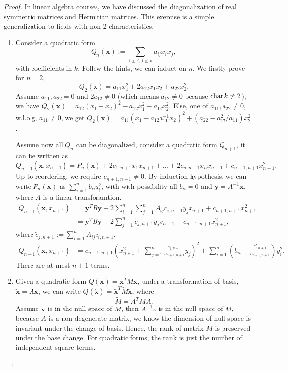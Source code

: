 \documentclass[11pt,fleqn]{book} %
\begin{document}
\begin{proof}
In linear algebra courses, we have discussed the diagonalization of real symmetric matrices and Hermitian matrices. This exercise is a simple generalization to fields with non-2 characteristics.
\begin{enumerate}[label=(\alph*)]
\item Consider a quadratic form 
$$
Q_{n}(\mathbf{x}):=\sum_{1\leq i,j\leq n}a_{ij}x_ix_j,
$$
with coefficients in $k$.
Follow the hints, we can induct on $n$. We firstly prove for $n=2$,
$$
Q_2(\mathbf{x})=a_{11}x_1^2+2a_{12}x_1x_2+a_{22}x_2^2.
$$
Assume $a_{11},a_{22}=0$ and $2a_{12}\neq 0$ (which means $a_{12}\neq 0$ because $\text{char\,} k\neq 2$), we have $Q_{2}(\mathbf{x})=a_{12}(x_1+x_2)^2-a_{12}x_1^2-a_{12}x_2^2$. Else, one of $a_{11},a_{22}\neq 0$, w.l.o.g, $a_{11}\neq 0$, we get $Q_2(\mathbf{x})=a_{11}(x_1-a_{12}a_{11}^{-1}x_2)^2+(a_{22}-a_{12}^2/a_{11})x_2^2$.

Assume now all $Q_n$ can be diagonalized, consider a quadratic form $Q_{n+1}$, it can be written as 
$$
Q_{n+1}(\mathbf{x},x_{n+1})=P_{n}(\mathbf{x})+2c_{1,n+1}x_1x_{n+1}+...+2c_{n,n+1}x_nx_{n+1}+c_{n+1,n+1}x_{n+1}^2.
$$
Up to reordering, we require $c_{n+1,n+1}\neq 0$.
By induction hypothesis, we can write $P_n(\mathbf{x})$ as $\sum_{i=1}^n b_{ii}y_i^2$, with with possibility all $b_{ii}=0$ and $\mathbf{y}=A^{-1}\mathbf{x}$, where $A$ is a linear transforamtion.
$$
\begin{aligned}
Q_{n+1}(\mathbf{x},x_{n+1})&=\mathbf{y}^{T}B\mathbf{y}+2\sum_{i=1}^n\sum_{j=1}^n A_{ij}c_{i,n+1}y_jx_{n+1}+c_{n+1,n+1}x_{n+1}^2\\
&=\mathbf{y}^{T}B\mathbf{y}+2\sum_{j=1}^n \tilde{c}_{j,n+1}y_jx_{n+1}+c_{n+1,n+1}x_{n+1}^2,
\end{aligned}
$$ 
where $\tilde{c}_{j,n+1}:=\sum_{i=1}^nA_{ij} c_{i,n+1}$.
$$
\begin{aligned}
Q_{n+1}(\mathbf{x},x_{n+1})
&=c_{n+1,n+1}\left(x_{n+1}^2+\sum_{j=1}^n\frac{\tilde{c}_{j,n+1}}{c_{n+1,n+1}}y_j\right)^2+\sum_{i=1}^n\left(b_{ii}-\frac{c_{j,n+1}^2}{c_{n+1,n+1}}\right) y_i^2.
\end{aligned}
$$ 
There are at most $n+1$ terms.
\item Given a quadratic form $Q(\mathbf{x})=\mathbf{x}^{T}M\mathbf{x}$, under a transformation of basis, $\tilde{\mathbf{x}}=A \mathbf{x}$, we can write $Q(\tilde{\mathbf{x}})=\tilde{\mathbf{x}}^T \tilde{M} \tilde{\mathbf{x}}$, where 
$$
\tilde{M}=A^{T}M A.
$$
Assume $\mathbf{v}$ is in the null space of $M$, then $A^{-1}v$ is  in the null space of $\tilde{M}$, because $A$ is a non-degenerate matrix, we know the dimension of  null space is invariant under the change of basis. Hence, the rank of matrix $M$ is preserved under the base change. For quadratic forms, the rank is just the number of independent square terms.
\end{enumerate}
\end{proof}
\end{document}
